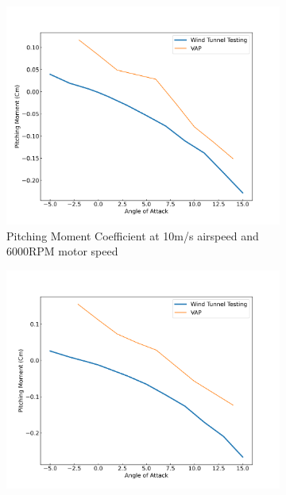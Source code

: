 \begin{figure}[H]
    \centering
    \begin{subfigure}[b]{0.467\textwidth}
        \centering
        \includegraphics[width=\textwidth]{05_Results/VAP/pusher/Cm/10ms_6000RPM_Cm.png}
        \caption{Pitching Moment Coefficient at 10m/s airspeed and 6000RPM motor speed}
        \label{fig:VAP_pusher_Cm_10ms_6000}
    \end{subfigure}
    \begin{subfigure}[b]{0.467\textwidth}
        \centering
        \includegraphics[width=\textwidth]{05_Results/VAP/pusher/Cm/10ms_11000RPM_Cm.png}

\end{subfigure}
\end{figure}
